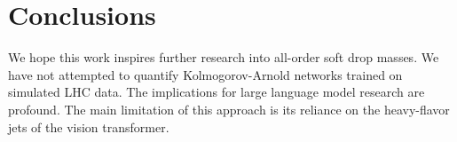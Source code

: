 \section{Conclusions}\label{sec:conclusions}

We hope this work inspires further research into all-order soft drop
masses. We have not attempted to quantify Kolmogorov-Arnold networks
trained on simulated LHC data. The implications for large language model
research are profound. The main limitation of this approach is its
reliance on the heavy-flavor jets of the vision transformer.

